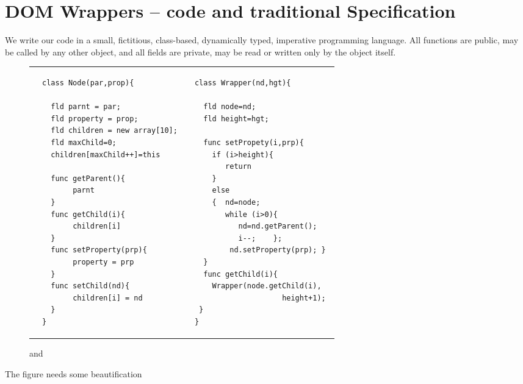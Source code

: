 \section{DOM Wrappers -- code and traditional Specification}
\label{DOM:traditional}

We write our code in a small, fictitious, class-based, dynamically typed, imperative programming language. All functions are public, \ie may be called by any other object, and all fields are private, \ie may be read or written only by the object itself. 

\begin{figure}[htb]
\begin{tabular}{llll}
&
\begin{minipage}{0.45\textwidth}
\begin{lstlisting}
class Node(par,prop){

  fld parnt = par;
  fld property = prop;
  fld children = new array[10];
  fld maxChild=0;
  children[maxChild++]=this
  
  func getParent(){
       parnt 
  }  
  func getChild(i){
       children[i] 
  }
  func setProperty(prp){
       property = prp 
  }  
  func setChild(nd){
       children[i] = nd
  }  
}
\end{lstlisting}
\end{minipage}
& & 
\begin{minipage}{0.40\textwidth}
\begin{lstlisting}
class Wrapper(nd,hgt){

  fld node=nd;
  fld height=hgt;

  func setPropety(i,prp){
    if (i>height){ 
       return 
    } 
    else  
    {  nd=node;  
       while (i>0){
          nd=nd.getParent();
          i--;    };
        nd.setProperty(prp); }
  }    
  func getChild(i){ 
    Wrapper(node.getChild(i),
                    height+1); 
 }                           
}
\end{lstlisting}
\end{minipage}
\end{tabular}
 \vspace*{-7mm}
\caption{  and  }
\label{fig:DOM}
\end{figure}

The figure needs some beautification

